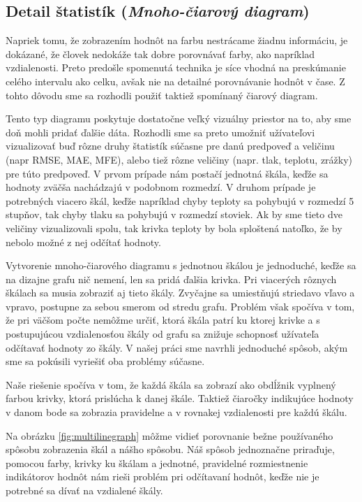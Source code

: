 \subsection{Detail štatistík {\small(\textit{Mnoho-čiarový diagram})}}
Napriek tomu, že zobrazením hodnôt na farbu nestrácame žiadnu informáciu, je dokázané, že človek nedokáže tak dobre porovnávať farby, ako napríklad vzdialenosti. Preto predošle spomenutá technika je síce vhodná na preskúmanie celého intervalu ako celku, avšak nie na detailné porovnávanie hodnôt v čase. Z tohto dôvodu sme sa rozhodli použiť taktiež spomínaný čiarový diagram. 

Tento typ diagramu poskytuje dostatočne veľký vizuálny priestor na to, aby sme doň mohli pridať ďalšie dáta. Rozhodli sme sa preto umožniť užívateľovi vizualizovať buď rôzne druhy štatistík súčasne pre danú predpoveď a veličinu (napr RMSE, MAE, MFE), alebo tiež rôzne veličiny (napr. tlak, teplotu, zrážky) pre túto predpoveď. V prvom prípade nám postačí jednotná škála, keďže sa hodnoty zväčša nachádzajú v podobnom rozmedzí. V druhom prípade je potrebných viacero škál, keďže napríklad chyby teploty sa pohybujú v rozmedzí 5 stupňov, tak chyby tlaku sa pohybujú v rozmedzí stoviek. Ak by sme tieto dve veličiny vizualizovali spolu, tak krivka teploty by bola sploštená natoľko, že by nebolo možné z nej odčítať hodnoty.

Vytvorenie mnoho-čiarového diagramu s jednotnou škálou je jednoduché, keďže sa na dizajne grafu nič nemení, len sa pridá ďalšia krivka. Pri viacerých rôznych škálach sa musia zobraziť aj tieto škály. Zvyčajne sa umiestňujú striedavo vľavo a vpravo, postupne za sebou smerom od stredu grafu. Problém však spočíva v tom, že pri väčšom počte nemôžme určiť, ktorá škála patrí ku ktorej krivke a s postupujúcou vzdialenosťou škály od grafu sa znižuje schopnosť užívateľa odčítavať hodnoty zo škály. V našej práci sme navrhli jednoduché spôsob, akým sme sa pokúsili vyriešiť oba problémy súčasne.

Naše riešenie spočíva v tom, že každá škála sa zobrazí ako obdĺžnik vyplnený farbou krivky, ktorá prislúcha k danej škále. Taktiež čiaročky indikujúce hodnoty v danom bode sa zobrazia pravidelne a v rovnakej vzdialenosti pre každú škálu.

Na obrázku \ref{fig:multilinegraph} môžme vidieť porovnanie bežne používaného spôsobu zobrazenia škál a nášho spôsobu. Náš spôsob jednoznačne priraďuje, pomocou farby, krivky ku škálam a jednotné, pravidelné rozmiestnenie indikátorov hodnôt nám rieši problém pri odčítavaní hodnôt, keďže nie je potrebné sa dívať na vzdialené škály.


